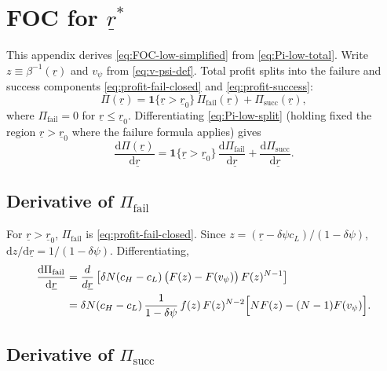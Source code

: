 \section{FOC for \texorpdfstring{$\underline{r}^{*}$}{underline r star}}
\label{app:foc-low}

This appendix derives \eqref{eq:FOC-low-simplified} from \eqref{eq:Pi-low-total}.
Write $z\equiv\beta^{-1}(\underline{r})$ and $v_{\psi}$ from \eqref{eq:v-psi-def}.
Total profit splits into the failure and success components
\eqref{eq:profit-fail-closed} and \eqref{eq:profit-success}:
\begin{equation}
  \Pi(\underline{r})
  = \mathbf{1}\{\underline{r}>\underline{r}_0\}\,
    \Pi_{\text{fail}}(\underline{r})
    + \Pi_{\text{succ}}(\underline{r}),
  \label{eq:Pi-low-split}
\end{equation}
where $\Pi_{\text{fail}}=0$ for $\underline{r}\le\underline{r}_0$.
Differentiating \eqref{eq:Pi-low-split} (holding fixed the region
$\underline{r}>\underline{r}_0$ where the failure formula applies) gives
\begin{equation}
  \frac{\mathrm d\Pi(\underline{r})}{\mathrm d\underline{r}}
  = \mathbf{1}\{\underline{r}>\underline{r}_0\}\,
    \frac{\mathrm d\Pi_{\text{fail}}}{\mathrm d\underline{r}}
    + \frac{\mathrm d\Pi_{\text{succ}}}{\mathrm d\underline{r}}.
  \label{eq:dPi-total}
\end{equation}

\subsection{Derivative of \texorpdfstring{$\Pi_{\text{fail}}$}{Pi fail}}
\label{subsec:deriv-fail}

For $\underline{r}>\underline{r}_0$, $\Pi_{\text{fail}}$ is
\eqref{eq:profit-fail-closed}.
Since $z=(\underline{r}-\delta\psi c_L)/(1-\delta\psi)$,
$\mathrm dz/\mathrm d\underline{r}=1/(1-\delta\psi)$.
Differentiating,
\begin{align}
  \frac{\mathrm d\Pi_{\text{fail}}}{\mathrm d\underline{r}}
  &= \frac{d}{d\underline{r}}
    \left[
      \delta N (c_H - c_L)\,
      \bigl(F(z) - F(v_{\psi})\bigr)\,
      F(z)^{N-1}
    \right]
  \notag\\
  &= \delta N (c_H - c_L)\,
    \frac{1}{1 - \delta \psi}\,
    f(z)\, F(z)^{N-2}
    \Bigl[
      N F(z)
      - (N-1) F(v_{\psi})
    \Bigr].
  \label{eq:deriv-fail}
\end{align}

\subsection{Derivative of \texorpdfstring{$\Pi_{\text{succ}}$}{Pi succ}}
\label{subsec:deriv-succ}

